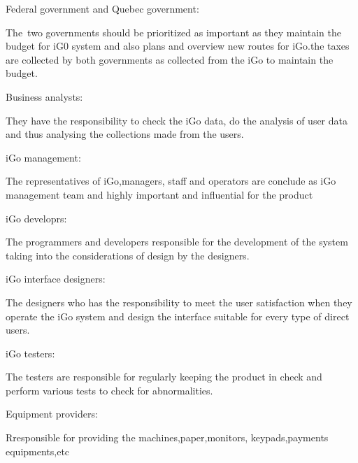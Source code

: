 \documentclass[12pt]{report}
\begin{document}
\vspace{\baselineskip}
Federal government and Quebec government:\par

The\ two governments should be prioritized as important as they maintain the budget for iG0 system and also plans and overview new routes for  iGo.the taxes are collected by both governments as collected from the iGo to maintain the budget.\par


\vspace{\baselineskip}

Business analysts:\par

They have the responsibility to check the iGo data, do the analysis of user data and thus analysing the collections made from the users.\par


\vspace{\baselineskip}
iGo management:\par

The representatives of iGo,managers, staff and operators are conclude as iGo management team and highly important and influential for the product\par


\vspace{\baselineskip}
iGo developrs:\par

The programmers and developers responsible for the development of the system taking into the considerations of design by the designers.\par


\vspace{\baselineskip}

iGo interface designers:\par

The designers who has the responsibility to meet the user satisfaction when they operate the iGo system and design the interface suitable for every type of direct users.\par

iGo testers:\par

The testers are responsible for regularly keeping the product in check and perform various tests to check for abnormalities.\par


\vspace{\baselineskip}
Equipment providers:\par
Rresponsible for providing the machines,paper,monitors, keypads,payments equipments,etc\par
\end{document}
